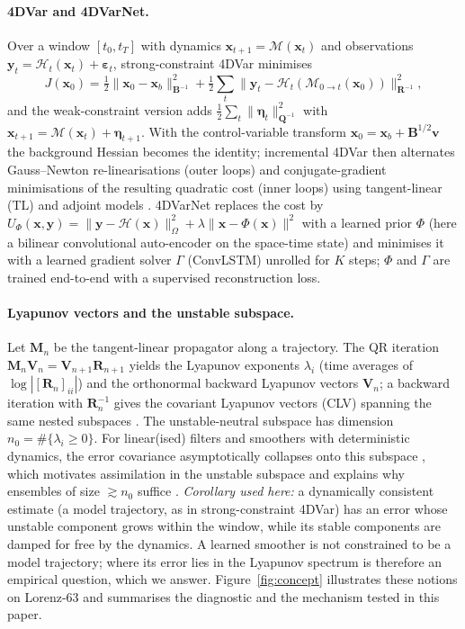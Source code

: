 \documentclass[10pt,a4paper]{article}
\newcommand{\x}{\mathbf{x}}
\newcommand{\y}{\mathbf{y}}
\newcommand{\M}{\mathcal{M}}
\newcommand{\Hop}{\mathcal{H}}
\newcommand{\B}{\mathbf{B}}
\newcommand{\R}{\mathbf{R}}
\begin{document}
\paragraph{4DVar and 4DVarNet.}
Over a window $[t_0,t_T]$ with dynamics $\x_{t+1}=\M(\x_t)$ and observations $\y_t=\Hop_t(\x_t)+\bm{\varepsilon}_t$,
strong-constraint 4DVar minimises
\begin{equation}
J(\x_0)=\tfrac12\|\x_0-\x_b\|^2_{\B^{-1}}+\tfrac12\textstyle\sum_t\|\y_t-\Hop_t(\M_{0\to t}(\x_0))\|^2_{\R^{-1}} ,
\label{eq:4dvar}
\end{equation}
and the weak-constraint version adds $\tfrac12\sum_t\|\bm{\eta}_t\|^2_{\mathbf{Q}^{-1}}$ with
$\x_{t+1}=\M(\x_t)+\bm{\eta}_{t+1}$. With the control-variable transform $\x_0=\x_b+\B^{1/2}\mathbf{v}$ the
background Hessian becomes the identity; incremental 4DVar then alternates Gauss--Newton re-linearisations (outer
loops) and conjugate-gradient minimisations of the resulting quadratic cost (inner loops) using tangent-linear (TL)
and adjoint models \citep{courtier1994strategy}.
4DVarNet \citep{fablet2021learning} replaces the cost by $U_\Phi(\x,\y)=\|\y-\Hop(\x)\|^2_\Omega+\lambda\|\x-\Phi(\x)\|^2$
with a learned prior $\Phi$ (here a bilinear convolutional auto-encoder on the space-time state) and minimises it with
a learned gradient solver $\Gamma$ (ConvLSTM) unrolled for $K$ steps; $\Phi$ and $\Gamma$ are trained end-to-end with
a supervised reconstruction loss.

\paragraph{Lyapunov vectors and the unstable subspace.}
Let $\mathbf{M}_n$ be the tangent-linear propagator along a trajectory. The QR iteration
$\mathbf{M}_n\mathbf{V}_n=\mathbf{V}_{n+1}\mathbf{R}_{n+1}$ \citep{benettin1980lyapunov} yields the Lyapunov
exponents $\lambda_i$ (time averages of $\log|[\mathbf{R}_n]_{ii}|$) and the orthonormal backward Lyapunov vectors
$\mathbf{V}_n$; a backward iteration with $\mathbf{R}_n^{-1}$ gives the covariant Lyapunov vectors (CLV) spanning the
same nested subspaces \citep{ginelli2007characterizing}. The unstable-neutral subspace has dimension
$n_0=\#\{\lambda_i\ge0\}$. For linear(ised) filters and smoothers with deterministic dynamics, the error covariance
asymptotically collapses onto this subspace \citep{gurumoorthy2017rank,bocquet2017degenerate}, which motivates
assimilation in the unstable subspace \citep{trevisan2010four} and explains why ensembles of size $\gtrsim n_0$
suffice \citep{bocquet2017fourdenvar}. \emph{Corollary used here:} a dynamically consistent estimate (a model
trajectory, as in strong-constraint 4DVar) has an error whose unstable component grows within the window, while its
stable components are damped for free by the dynamics. A learned smoother is not constrained to be a model
trajectory; where its error lies in the Lyapunov spectrum is therefore an empirical question, which we answer.
Figure~\ref{fig:concept} illustrates these notions on Lorenz-63 and summarises the diagnostic and the mechanism
tested in this paper.
\end{document}
